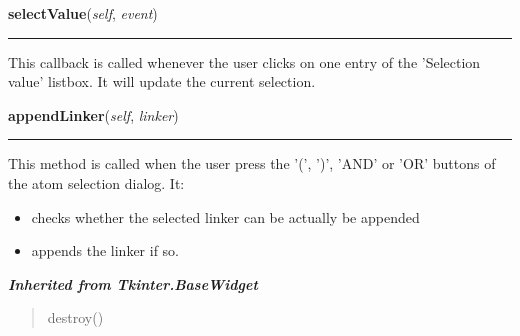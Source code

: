 \hspace{.8\funcindent}\begin{boxedminipage}{\funcwidth}

    \raggedright \textbf{selectValue}(\textit{self}, \textit{event})

    \vspace{-1.5ex}

    \rule{\textwidth}{0.5\fboxrule}
\setlength{\parskip}{2ex}
    This callback is called whenever the user clicks on one entry of the 
    'Selection value' listbox. It will update the current selection.

\setlength{\parskip}{1ex}
    \end{boxedminipage}

    \label{nMOLDYN:GUI:SelectionDialog:SelectionDialog:appendLinker}

    \vspace{0.5ex}

\hspace{.8\funcindent}\begin{boxedminipage}{\funcwidth}

    \raggedright \textbf{appendLinker}(\textit{self}, \textit{linker})

    \vspace{-1.5ex}

    \rule{\textwidth}{0.5\fboxrule}
\setlength{\parskip}{2ex}
    This method is called when the user press the '(', ')', 'AND' or 'OR' 
    buttons of the atom selection dialog. It:

    \begin{itemize}
    \setlength{\parskip}{0.6ex}
      \item checks whether the selected linker can be actually be appended

      \item appends the linker if so.

    \end{itemize}

\setlength{\parskip}{1ex}
    \end{boxedminipage}


\large{\textbf{\textit{Inherited from Tkinter.BaseWidget}}}

\begin{quote}
destroy()
\end{quote}

